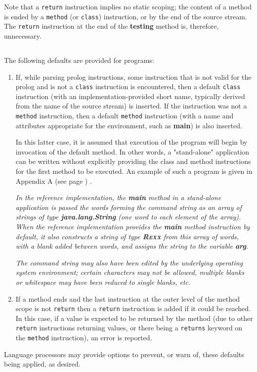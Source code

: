 Note that a \texttt{return} instruction implies no static scoping; the
content of a method is ended by a \texttt{method} (or \texttt{class})
instruction, or by the end of the source stream.
The \texttt{return} instruction at the end of the \textbf{testing}
method is, therefore, unnecessary.
\subsection{}\label{}
 
The following defaults are provided for \nr{} programs:
\begin{enumerate}
\item If, while parsing prolog instructions, some instruction that is not
valid for the prolog and is not a \texttt{class} instruction is
encountered, then a default \texttt{class} instruction (with an
implementation-provided short name, typically derived from the name of
the source stream) is inserted.  If the instruction was not a
\texttt{method} instruction, then a default \texttt{method} instruction
(with a name and attributes appropriate for the environment, such
as \textbf{main}) is also inserted.
 
In this latter case, it is assumed that execution of the program will
begin by invocation of the default method.
In other words, a "stand-alone" application can be written without
explicitly providing the class and method instructions for the first
method to be executed.
An example of such a program is given in  Appendix A (see page \pageref{refappa}) .

 
\emph{In the reference implementation, the \textbf{main} method in a
stand-alone application is passed the words forming the command string
as an array of strings of type \textbf{java.lang.String} (one word to
each element of the array).
When the \nr{} reference implementation provides the \textbf{main}
method instruction by default, it also constructs a \nr{} string of
type \textbf{R\textsc{exx}} from this array of words, with a blank added
between words, and assigns the string to the variable
\textbf{arg}.}
 
\emph{The command string may also have been edited by the underlying
operating system environment; certain characters may not be
allowed, multiple blanks or whitespace may have been reduced to
single blanks, etc.
}
\item If a method ends and the last instruction at the outer level of the
method scope is not \texttt{return} then a \texttt{return} instruction
is added if it could be reached.
In this case, if a value is expected to be returned by the method (due
to other \texttt{return} instructions returning values, or there being a
\texttt{returns} keyword on the \texttt{method} instruction), an error
is reported.
\end{enumerate}
 
Language processors may provide options to prevent, or warn of, these
defaults being applied, as desired.
